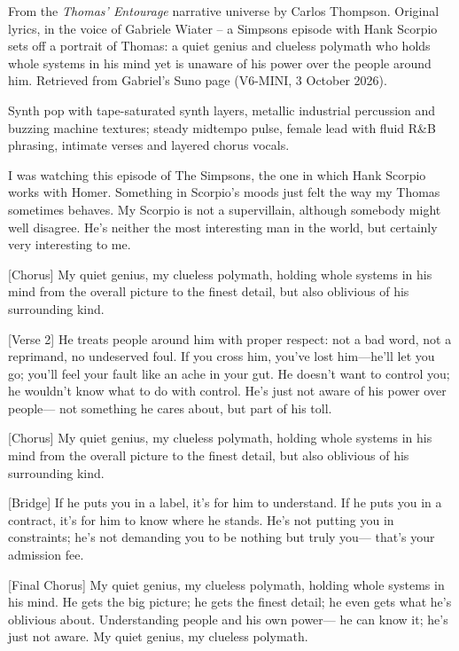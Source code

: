 
\label{sec:my-quiet-genius}
\begin{notes}
From the \emph{Thomas’ Entourage} narrative universe by Carlos Thompson. Original lyrics, in the voice of Gabriele Wiater -- a Simpsons episode with Hank Scorpio sets off a portrait of Thomas: a quiet genius and clueless polymath who holds whole systems in his mind yet is unaware of his power over the people around him. Retrieved from Gabriel's Suno page (V6-MINI, 3 October 2026).
\end{notes}
\begin{style}
Synth pop with tape-saturated synth layers, metallic industrial percussion and buzzing machine textures; steady midtempo pulse, female lead with fluid R&B phrasing, intimate verses and layered chorus vocals.
\end{style}
\begin{lyrics}
[Verse 1]
I was watching this episode of The Simpsons,
the one in which Hank Scorpio works with Homer.
Something in Scorpio’s moods just felt
the way my Thomas sometimes behaves.
My Scorpio is not a supervillain, although
somebody might well disagree.
He’s neither the most interesting man in the world,
but certainly very interesting to me.

[Chorus]
My quiet genius, my clueless polymath,
holding whole systems in his mind
from the overall picture to the finest detail,
but also oblivious of his surrounding kind.

[Verse 2]
He treats people around him with proper respect:
not a bad word, not a reprimand, no undeserved foul.
If you cross him, you’ve lost him—he’ll let you go;
you’ll feel your fault like an ache in your gut.
He doesn’t want to control you;
he wouldn’t know what to do with control.
He’s just not aware of his power over people—
not something he cares about, but part of his toll.

[Chorus]
My quiet genius, my clueless polymath,
holding whole systems in his mind
from the overall picture to the finest detail,
but also oblivious of his surrounding kind.

[Bridge]
If he puts you in a label,
it’s for him to understand.
If he puts you in a contract,
it’s for him to know where he stands.
He’s not putting you in constraints;
he’s not demanding you to be
nothing but truly you—
that’s your admission fee.

[Final Chorus]
My quiet genius, my clueless polymath,
holding whole systems in his mind.
He gets the big picture;
he gets the finest detail;
he even gets what he’s oblivious about.
Understanding people and his own power—
he can know it; he’s just not aware.
My quiet genius,
my clueless polymath.
\end{lyrics}

